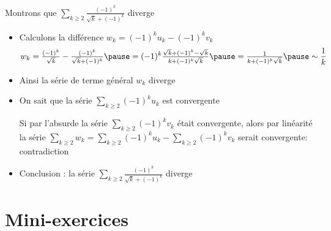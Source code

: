 \begin{frame}
\begin{exemple}

Montrons que $\displaystyle\sum_{k \ge 2} \frac{(-1)^k}{\sqrt{k}+(-1)^k}$ diverge

\begin{itemize}
  \item\pause  Calculons la différence $w_k = (-1)^ku_k-(-1)^kv_k$
  \pause 
$$
w_k 
=  \tfrac{(-1)^k}{\sqrt{k}}-\tfrac{(-1)^k}{\sqrt{k}+(-1)^k} 
\pause = (-1)^k\tfrac{\sqrt{k}+(-1)^k-\sqrt{k}}{k+(-1)^k\sqrt{k}} 
\pause =  \tfrac{1}{k+(-1)^k\sqrt{k}} 
\pause \sim  \frac{1}{k} 
$$

\item\pause 
Ainsi la série de terme général $w_k$
diverge

\item\pause  On sait que la série $\sum_{k \ge 2} (-1)^k u_k$
est convergente

\pause 
Si par l'absurde la série
$\sum_{k \ge 2}(-1)^k v_k$ était convergente, \pause alors par linéarité la série
$\sum_{k \ge 2} w_k = \sum_{k \ge 2} (-1)^k u_k - \sum_{k \ge 2} (-1)^k v_k$
serait convergente\pause  : contradiction

\item\pause 
Conclusion : la série $\sum_{k \ge 2} \frac{(-1)^k}{\sqrt{k}+(-1)^k}$ diverge
\end{itemize}
\end{exemple}

\end{frame}



\section{Mini-exercices}

